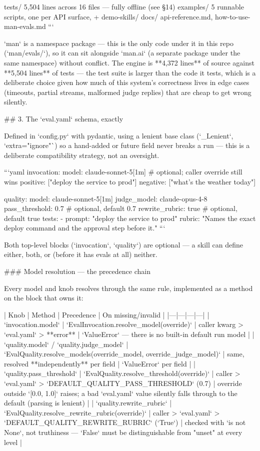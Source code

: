 tests/            5,504 lines across 16 files — fully offline (see §14)
examples/         5 runnable scripts, one per API surface, + demo-skills/
docs/             api-reference.md, how-to-use-man-evals.md
```

`man` is a namespace package — this is the only code under it in this repo (`man/evals/`), so it can sit alongside `man.ai` (a separate package under the same namespace) without conflict.
The engine is **4,372 lines** of source against **5,504 lines** of tests — the test suite is larger than the code it tests, which is a deliberate choice given how much of this system's correctness lives in edge cases (timeouts, partial streams, malformed judge replies) that are cheap to get wrong silently.

## 3. The `eval.yaml` schema, exactly

Defined in `config.py` with pydantic, using a lenient base class (`_Lenient`, `extra="ignore"`) so a hand-added or future field never breaks a run — this is a deliberate compatibility strategy, not an oversight.

```yaml
invocation:
  model: claude-sonnet-5[1m]      # optional; caller override still wins
  positive: ["deploy the service to prod"]
  negative: ["what's the weather today"]

quality:
  model: claude-sonnet-5[1m]
  judge_model: claude-opus-4-8
  pass_threshold: 0.7             # optional, default 0.7
  rewrite_rubric: true            # optional, default true
  tests:
    - prompt: "deploy the service to prod"
      rubric: "Names the exact deploy command and the approval step before it."
```

Both top-level blocks (`invocation`, `quality`) are optional — a skill can define either, both, or (before it has evals at all) neither.

### Model resolution — the precedence chain

Every model and knob resolves through the same rule, implemented as a method on the block that owns it:

| Knob | Method | Precedence | On missing/invalid |
|---|---|---|---|
| `invocation.model` | `EvalInvocation.resolve_model(override)` | caller kwarg > `eval.yaml` > **error** | `ValueError` — there is no built-in default run model |
| `quality.model` / `quality.judge_model` | `EvalQuality.resolve_models(override_model, override_judge_model)` | same, resolved **independently** per field | `ValueError` per field |
| `quality.pass_threshold` | `EvalQuality.resolve_threshold(override)` | caller > `eval.yaml` > `DEFAULT_QUALITY_PASS_THRESHOLD` (0.7) | override outside `[0.0, 1.0]` raises; a bad `eval.yaml` value silently falls through to the default (parsing is lenient) |
| `quality.rewrite_rubric` | `EvalQuality.resolve_rewrite_rubric(override)` | caller > `eval.yaml` > `DEFAULT_QUALITY_REWRITE_RUBRIC` (`True`) | checked with `is not None`, not truthiness — `False` must be distinguishable from "unset" at every level |

